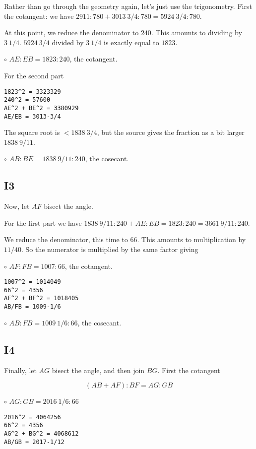 \documentclass[11pt, oneside]{article}
\begin{document}
Rather than go through the geometry again, let's just use the trigonometry.  First the cotangent:  we have $2911:780 + 3013 \ 3/4:780 = 5924 \ 3/4:780$.  

At this point, we reduce the denominator to $240$.  This amounts to dividing by $3 \ 1/4$.  $5924 \ 3/4$ divided by $3 \ 1/4$ is exactly equal to $1823$.

$\circ$ $AE:EB = 1823:240$, the cotangent.

For the second part 

\begin{verbatim}
1823^2 = 3323329
240^2 = 57600
AE^2 + BE^2 = 3380929
AE/EB = 3013-3/4
\end{verbatim}

The square root is $< 1838 \ 3/4$, but the source gives the fraction as a bit larger $1838 \ 9/11$.

$\circ$ $AB:BE = 1838 \ 9/11: 240$, the cosecant.

\subsection*{I3}

Now, let $AF$ bisect the angle.

For the first part we have $1838 \ 9/11: 240 + AE:EB = 1823:240 = 3661 \ 9/11:240$. 

 We reduce the denominator, this time to $66$.  This amounts to multiplication by $11/40$.  So the numerator is multiplied by the same factor giving

$\circ$ $AF:FB = 1007:66$, the cotangent.

\begin{verbatim}
1007^2 = 1014049
66^2 = 4356
AF^2 + BF^2 = 1018405
AB/FB = 1009-1/6
\end{verbatim}

$\circ$ $AB:FB = 1009 \ 1/6:66$, the cosecant.

\subsection*{I4}

Finally, let $AG$ bisect the angle, and then join $BG$.  First the cotangent

\[ (AB + AF):BF = AG:GB \]

$\circ$ $AG:GB = 2016 \ 1/6:66$

\begin{verbatim}
2016^2 = 4064256
66^2 = 4356
AG^2 + BG^2 = 4068612
AB/GB = 2017-1/12
\end{verbatim}
\end{document}
